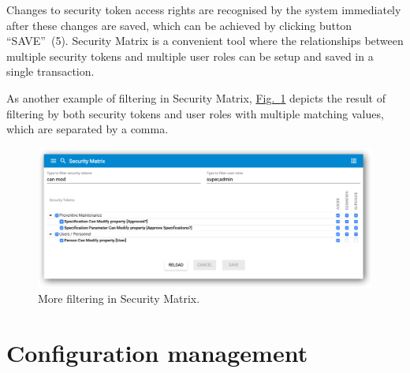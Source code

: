 \documentclass[a4paper,12pt,oneside,openright]{memoir}
\begin{document}
	Changes to security token access rights are recognised by the system immediately after these changes are saved, which can be achieved by clicking button ``SAVE''~(5).
	Security Matrix is a convenient tool where the relationships between multiple security tokens and multiple user roles can be setup and saved in a single transaction.

	As another example of filtering in Security Matrix, \hyperref[sec:03_01:fig:6]{Fig.~\ref*{sec:03_01:fig:6}} depicts the result of filtering by both security tokens and user roles with multiple matching values, which are separated by a comma.

	\begin{figure}[h!tbp]
	\centering
	\includegraphics[width=0.9\linewidth]{images/11-security-matrix-filtering-can-modif-and-roles.png}
	\caption{More filtering in Security Matrix.}\label{sec:03_01:fig:6}
	\end{figure}

\section*{Configuration management}\label{sec:04}
\end{document}
